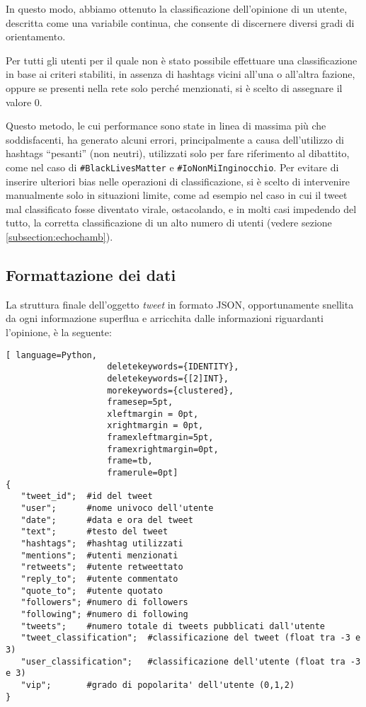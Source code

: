     In questo modo, abbiamo ottenuto la classificazione dell'opinione di un utente, descritta come una variabile continua, che consente di discernere diversi gradi di orientamento. 
    
    Per tutti gli utenti per il quale non è stato possibile effettuare una classificazione in base ai criteri stabiliti, in assenza di hashtags vicini all'una o all'altra fazione, oppure se presenti nella rete solo perché menzionati, si è scelto di assegnare il valore 0. 
    
    Questo metodo, le cui performance sono state in linea di massima più che soddisfacenti, ha generato alcuni errori, principalmente a causa dell'utilizzo di hashtags ``pesanti'' (non neutri), utilizzati solo per fare riferimento al dibattito, come nel caso di \texttt{\#BlackLivesMatter} e \texttt{\#IoNonMiInginocchio}. Per evitare di inserire ulteriori bias nelle operazioni di classificazione, si è scelto di intervenire manualmente solo in situazioni limite, come ad esempio nel caso in cui il tweet mal classificato fosse diventato virale, ostacolando, e in molti casi impedendo del tutto, la corretta classificazione di un alto numero di utenti (vedere sezione \ref{subsection:echochamb}). 
    
    \subsection{Formattazione dei dati}\label{subsection:format}
    
        La struttura finale dell'oggetto \textit{tweet} in formato JSON, opportunamente snellita da ogni informazione superflua e arricchita dalle informazioni riguardanti l'opinione, è la seguente:
        
        \begin{lstlisting}[ language=Python,
                    deletekeywords={IDENTITY},
                    deletekeywords={[2]INT},
                    morekeywords={clustered},
                    framesep=5pt,
                    xleftmargin = 0pt,
                    xrightmargin = 0pt,
                    framexleftmargin=5pt,
                    framexrightmargin=0pt,
                    frame=tb,
                    framerule=0pt]
{
   "tweet_id";  #id del tweet
   "user";      #nome univoco dell'utente
   "date";      #data e ora del tweet
   "text";      #testo del tweet
   "hashtags";  #hashtag utilizzati
   "mentions";  #utenti menzionati
   "retweets";  #utente retweettato  
   "reply_to";  #utente commentato
   "quote_to";  #utente quotato
   "followers"; #numero di followers
   "following"; #numero di following
   "tweets";    #numero totale di tweets pubblicati dall'utente
   "tweet_classification";  #classificazione del tweet (float tra -3 e 3)
   "user_classification";   #classificazione dell'utente (float tra -3 e 3)
   "vip";       #grado di popolarita' dell'utente (0,1,2)
}
        \end{lstlisting}
        

